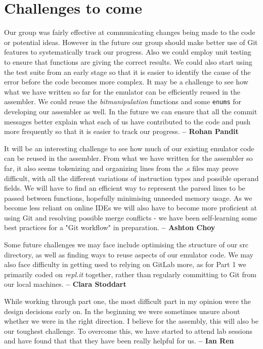 \documentclass[11pt]{article}
\begin{document}
\section{Challenges to come}
Our group was fairly effective at communicating changes being made to the code or potential ideas. However in the future our group should make better use of Git features to systematically track our progress. Also we could employ unit testing to ensure that functions are giving the correct results. We could also start using the test suite from an early stage so that it is easier to identify the cause of the error before the code becomes more complex. It may be a challenge to see how what we have written so far for the emulator can be efficiently reused in the assembler. We could reuse the \textit{bitmanipulation} functions and some \texttt{enums} for developing our assembler as well. In the future we can ensure that all the commit messages better explain what each of us have contributed to the code and push more frequently so that it is easier to track our progress. \textbf{-- Rohan Pandit}

It will be an interesting challenge to see how much of our existing emulator code can be reused in the assembler. From what we have written for the assembler so far, it also seems tokenizing and organizing lines from the .s files may prove difficult, with all the different variations of instruction types and possible operand fields. We will have to find an efficient way to represent the parsed lines to be passed between functions, hopefully minimising unneeded memory usage. As we become less reliant on online IDEs we will also have to become more proficient at using Git and resolving possible merge conflicts - we have been self-learning some best practices for a "Git workflow" in preparation.
\textbf{-- Ashton Choy}

Some future challenges we may face include optimising the structure of our src directory, as well as finding ways to reuse aspects of our emulator code. We may also face difficulty in getting used to relying on GitLab more, as for Part 1 we primarily coded on \textit{repl.it} together, rather than regularly committing to Git from our local machines. \textbf{-- Clara Stoddart}

While working through part one, the most difficult part in my opinion were the design decisions early on. In the beginning we were sometimes unsure about whether we were in the right direction. I believe for the assembly, this will also be our toughest challenge. To overcome this, we have started to attend lab sessions and have found that that they have been really helpful for us. \textbf{-- Ian Ren}
\end{document}
